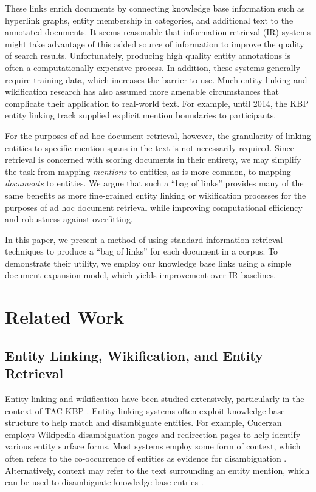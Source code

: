 \documentclass{sig-alternate}
\begin{document}
These links enrich documents by connecting knowledge base information such as hyperlink graphs, entity membership in categories, and additional text to the annotated documents. It seems reasonable that information retrieval (IR) systems might take advantage of this added source of information to improve the quality of search results. Unfortunately, producing high quality entity annotations is often a computationally expensive process. In addition, these systems generally require training data, which increases the barrier to use. Much entity linking and wikification research has also assumed more amenable circumstances that complicate their application to real-world text. For example, until 2014, the KBP entity linking track supplied explicit mention boundaries to participants.

For the purposes of ad hoc document retrieval, however, the granularity of linking entities to specific mention spans in the text is not necessarily required. Since retrieval is concerned with scoring documents in their entirety, we may simplify the task from mapping \textit{mentions} to entities, as is more common, to mapping \textit{documents} to entities. We argue that such a ``bag of links'' provides many of the same benefits as more fine-grained entity linking or wikification processes for the purposes of ad hoc document retrieval while improving computational efficiency and robustness against overfitting. 

In this paper, we present a method of using standard information retrieval techniques to produce a ``bag of links'' for each document in a corpus. To demonstrate their utility, we employ our knowledge base links using a simple document expansion model, which yields improvement over IR baselines.

\section{Related Work}\label{section.related}

\subsection{Entity Linking, Wikification, and Entity Retrieval}\label{section.related.entities}

Entity linking and wikification have been studied extensively, particularly in the context of TAC KBP \cite{Ji2014}. Entity linking systems often exploit knowledge base structure to help match and disambiguate entities. For example, Cucerzan \cite{Cucerzan2007} employs Wikipedia disambiguation pages and redirection pages to help identify various entity surface forms. Most systems employ some form of context, which often refers to the co-occurrence of entities as evidence for disambiguation \cite{Stoyanov2012, Dalton2013}. Alternatively, context may refer to the text surrounding an entity mention, which can be used to disambiguate knowledge base entries \cite{Mihalcea2007, Dalton2013}.
\end{document}
